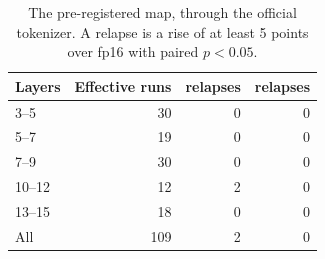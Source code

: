 \begin{table}[t]
\centering\small\setlength{\tabcolsep}{4.5pt}
\begin{tabular}{lrrr}
\toprule
Layers & Effective runs & \fq{} relapses & \nf{} relapses \\
\midrule
3--5 & 30 & 0 & 0 \\
5--7 & 19 & 0 & 0 \\
7--9 & 30 & 0 & 0 \\
10--12 & 12 & 2 & 0 \\
13--15 & 18 & 0 & 0 \\
\midrule
All & 109 & 2 & 0 \\
\bottomrule
\end{tabular}
\caption{The pre-registered map, through the official tokenizer. A relapse is a rise of at least 5 points over fp16 with paired $p<0.05$.}
\label{tab:map}
\end{table}
